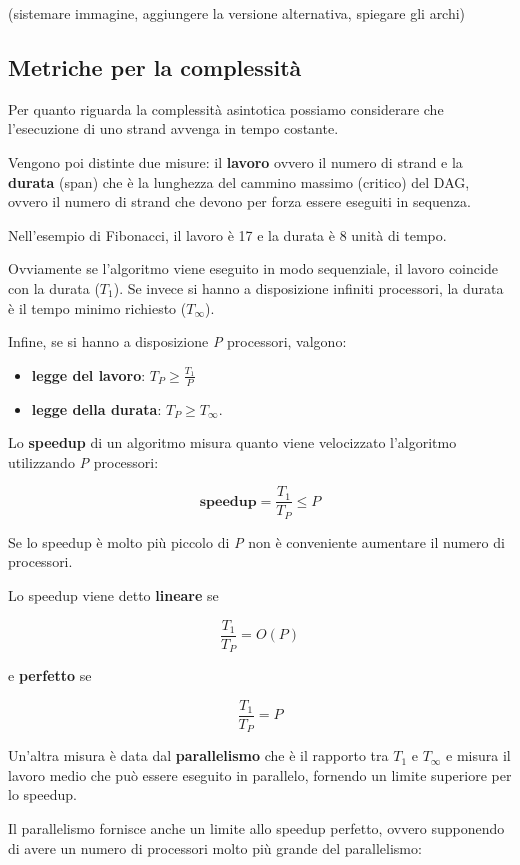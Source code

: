 (sistemare immagine, aggiungere la versione alternativa, spiegare gli
archi)

\subsection{Metriche per la complessità}\label{metriche-per-la-complessituxe0}

Per quanto riguarda la complessità asintotica possiamo considerare che l'esecuzione di uno strand avvenga in tempo costante.

Vengono poi distinte due misure: il \textbf{lavoro} ovvero il numero di strand e la \textbf{durata} (span) che è la lunghezza del cammino massimo (critico) del DAG, ovvero il numero di strand che devono per forza essere eseguiti in sequenza.

Nell'esempio di Fibonacci, il lavoro è 17 e la durata è 8 unità di tempo.

Ovviamente se l'algoritmo viene eseguito in modo sequenziale, il lavoro coincide con la durata ($T_1$). 
Se invece si hanno a disposizione infiniti processori, la durata è il tempo minimo richiesto ($T_\infty$). 

Infine, se si hanno a disposizione \emph{P} processori, valgono:

\begin{itemize}
	\item \textbf{legge del lavoro}: $T_P \geq \frac{T_1}{P}$
	\item \textbf{legge della durata}: $T_P \geq T_\infty$.
\end{itemize}

Lo \textbf{speedup} di un algoritmo misura quanto viene velocizzato l'algoritmo utilizzando \emph{P} processori:

$$\textbf{speedup} = \frac{T_1}{T_P} \leq P$$

Se lo speedup è molto più piccolo di \emph{P} non è conveniente aumentare il numero di processori.

Lo speedup viene detto \textbf{lineare} se

$$\frac{T_1}{T_P} = O(P)$$

e \textbf{perfetto} se

$$\frac{T_1}{T_P}  = P$$

Un'altra misura è data dal \textbf{parallelismo} che è il rapporto tra $T_1$ e $T_\infty$ e misura il lavoro medio che può essere eseguito in parallelo, fornendo un limite superiore per lo speedup.

Il parallelismo fornisce anche un limite allo speedup perfetto, ovvero supponendo di avere un numero di processori molto più grande del parallelismo:

